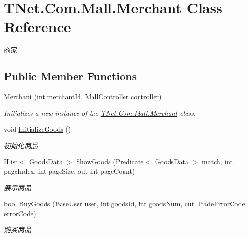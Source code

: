 \hypertarget{class_t_net_1_1_com_1_1_mall_1_1_merchant}{}\section{T\+Net.\+Com.\+Mall.\+Merchant Class Reference}
\label{class_t_net_1_1_com_1_1_mall_1_1_merchant}


商家  


\subsection*{Public Member Functions}
\begin{DoxyCompactItemize}
\item 
\mbox{\hyperlink{class_t_net_1_1_com_1_1_mall_1_1_merchant_a9895dbbfb76c8d7815377c001e4925ab}{Merchant}} (int merchant\+Id, \mbox{\hyperlink{class_t_net_1_1_com_1_1_mall_1_1_mall_controller}{Mall\+Controller}} controller)
\begin{DoxyCompactList}\small\item\em Initializes a new instance of the \mbox{\hyperlink{class_t_net_1_1_com_1_1_mall_1_1_merchant}{T\+Net.\+Com.\+Mall.\+Merchant}} class. \end{DoxyCompactList}\item 
void \mbox{\hyperlink{class_t_net_1_1_com_1_1_mall_1_1_merchant_a02c61749f291218d23749705cd5974e8}{Initialize\+Goods}} ()
\begin{DoxyCompactList}\small\item\em 初始化商品 \end{DoxyCompactList}\item 
I\+List$<$ \mbox{\hyperlink{class_t_net_1_1_com_1_1_model_1_1_goods_data}{Goods\+Data}} $>$ \mbox{\hyperlink{class_t_net_1_1_com_1_1_mall_1_1_merchant_a14e1cd4cd3083c89490cb982bbbe2bb7}{Show\+Goods}} (Predicate$<$ \mbox{\hyperlink{class_t_net_1_1_com_1_1_model_1_1_goods_data}{Goods\+Data}} $>$ match, int page\+Index, int page\+Size, out int page\+Count)
\begin{DoxyCompactList}\small\item\em 展示商品 \end{DoxyCompactList}\item 
bool \mbox{\hyperlink{class_t_net_1_1_com_1_1_mall_1_1_merchant_af787957e959d176b192dfef20f681bad}{Buy\+Goods}} (\mbox{\hyperlink{class_t_net_1_1_context___1_1_base_user}{Base\+User}} user, int goods\+Id, int goods\+Num, out \mbox{\hyperlink{namespace_t_net_1_1_com_1_1_mall_a8ed58f71da1d1495830104612fc5667a}{Trade\+Error\+Code}} error\+Code)
\begin{DoxyCompactList}\small\item\em 购买商品 \end{DoxyCompactList}\end{DoxyCompactItemize}


